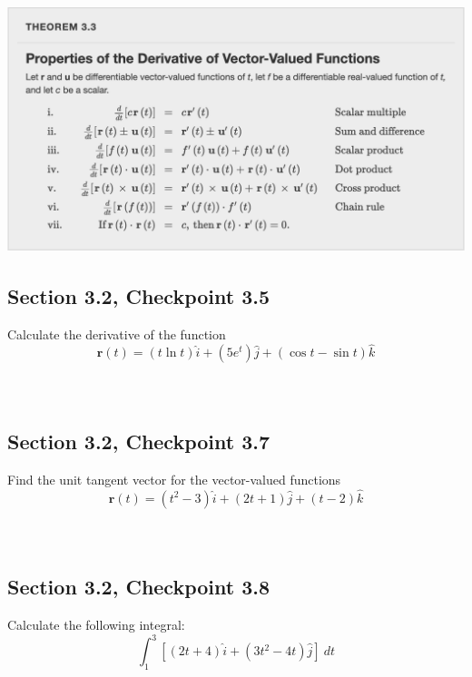 \documentclass[]{mangos-musings}
\begin{document}
\begin{center}
  \includegraphics[scale=0.6]{assets/rec05-derivative-properties.png}
\end{center}

\newpage
\subsection{Section 3.2, Checkpoint 3.5}
Calculate the derivative of the function 
\[\mathbf{r}(t) = (t\ln t)\hat{i} + (5e^t)\hat{j} + (\cos t - \sin t)\hat{k}\]
\begin{align*}
  \\ \\ \\ \\ \\ \\
\end{align*}

\subsection{Section 3.2, Checkpoint 3.7}
Find the unit tangent vector for the vector-valued functions
\[\mathbf{r}(t) = (t^2-3)\hat{i} + (2t+1)\hat{j} + (t-2)\hat{k}\]
\begin{align*}
  \\ \\ \\ \\ \\ \\
\end{align*}

\subsection{Section 3.2, Checkpoint 3.8}
Calculate the following integral:
\[\int_{1}^{3}\left[(2t+4)\hat{i} + (3t^2 - 4t)\hat{j}\right] \ dt\]
\end{document}
